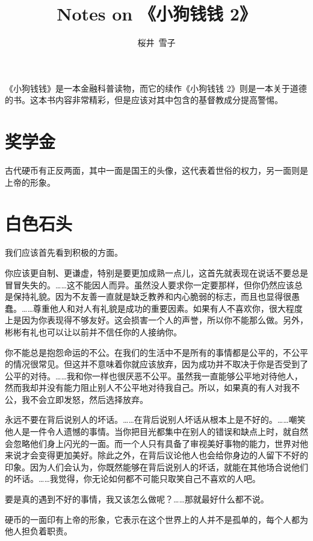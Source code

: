 \documentclass[fontset=founder]{ctexart}
\title{Notes on 《小狗钱钱 2》}
\author{桜井\ 雪子}
\date{}
\begin{document}
\maketitle
\tableofcontents

《小狗钱钱》是一本金融科普读物，而它的续作《小狗钱钱 2》则是一本关于道德的书。这本书内容非常精彩，但是应该对其中包含的基督教成分提高警惕。

\section{奖学金}

古代硬币有正反两面，其中一面是国王的头像，这代表着世俗的权力，另一面则是上帝的形象。

\section{白色石头}

我们应该首先看到积极的方面。

你应该更自制、更谦虚，特别是要更加成熟一点儿，这首先就表现在说话不要总是冒冒失失的。……这不能因人而异。虽然没人要求你一定要那样，但你仍然应该总是保持礼貌。因为不友善一直就是缺乏教养和内心脆弱的标志，而且也显得很愚蠢。……尊重他人和对人有礼貌是成功的重要因素。如果有人不喜欢你，很大程度上是因为你表现得不够友好。这会损害一个人的声誉，所以你不能那么做。另外，彬彬有礼也可以让以前并不信任你的人接纳你。

你不能总是抱怨命运的不公。在我们的生活中不是所有的事情都是公平的，不公平的情况很常见。但这并不意味着你就应该放弃，因为成功并不取决于你是否受到了公平的对待。……我和你一样也很厌恶不公平。虽然我一直能够公平地对待他人，然而我却并没有能力阻止别人不公平地对待我自己。所以，如果真的有人对我不公，我不会立即发怒，然后选择放弃。

永远不要在背后说别人的坏话。……在背后说别人坏话从根本上是不好的。……嘲笑他人是一件令人遗憾的事情。当你把目光都集中在别人的错误和缺点上时，就自然会忽略他们身上闪光的一面。而一个人只有具备了审视美好事物的能力，世界对他来说才会变得更加美好。除此之外，在背后议论他人也会给你身边的人留下不好的印象。因为人们会认为，你既然能够在背后说别人的坏话，就能在其他场合说他们的坏话。……我觉得，你无论如何都不可能只取笑自己不喜欢的人吧。

要是真的遇到不好的事情，我又该怎么做呢？……那就最好什么都不说。

硬币的一面印有上帝的形象，它表示在这个世界上的人并不是孤单的，每个人都为他人担负着职责。
\end{document}
